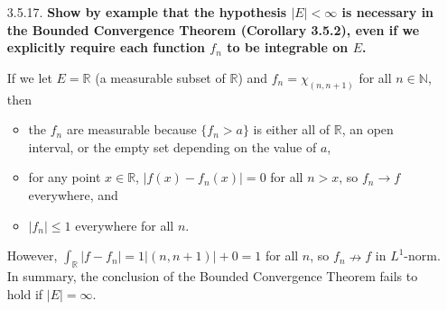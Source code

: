 \documentclass[a4paper,12pt]{article}
\begin{document}
\begin{enumerate}
    \item[3.5.17.]
        \boldmath\textbf{Show by example that the hypothesis $|E| < \infty$ is necessary in the Bounded Convergence Theorem (Corollary 3.5.2), even if we explicitly require each function $f_n$ to be integrable on $E$.
        }\unboldmath \par
        If we let $E = \mathbb{R}$ (a measurable subset of $\mathbb{R}$) and $f_n = \chi_{(n, n + 1)}$ for all $n \in \mathbb{N}$, then
        \begin{itemize}
            \item
                the $f_n$ are measurable because $\{ f_n > a \}$ is either all of $\mathbb{R}$, an open interval, or the empty set depending on the value of $a$,
            \item
                for any point $x \in \mathbb{R}$, $|f(x) - f_n(x)| = 0$ for all $n > x$, so $f_n \to f$ everywhere, and
            \item
                $|f_n| \leq 1$ everywhere for all $n$.
        \end{itemize}
        However, $\int_\mathbb{R} |f - f_n| = 1|(n, n + 1)| + 0 = 1$ for all $n$, so $f_n \nrightarrow f$ in $L^1$-norm. In summary, the conclusion of the Bounded Convergence Theorem fails to hold if $|E| = \infty$.


\end{enumerate}
\end{document}
